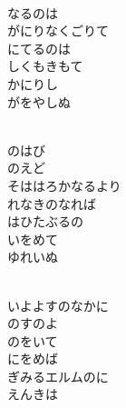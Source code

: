 \documentclass[10pt,b5j]{tarticle} %
\begin{document}
\vspace{1.5em} %
\newcommand{\linespace}{0.5em} %
\newcommand{\blocksize}{0.5\hsize} %
\newcommand{\itemmargin}{6em} %
\begin{enumerate} %
    \setlength{\itemindent}{\itemmargin} %
    \begin{minipage}[c]{\blocksize}
    
        \vspace{\linespace}
        \item~\\
        なるのは\\
        がにりなくごりて\\
        にてるのは\\
        しくもきもて\\
        かにりし\\
        がをやしぬ
        
        \vspace{\linespace}
        \item~\\
        のはび\\
        のえど\\
        そははろかなるより\\
        れなきのなれば\\
        はひたぶるの\\
        いをめて\\
        ゆれいぬ
        
        \vspace{\linespace}
        \item~\\
        いよよすのなかに\\
        のすのよ\\
        のをいて\\
        にをめば\\
        ぎみるエルムのに\\
        えんきは
        

\end{minipage}
\end{enumerate}
\end{document}
